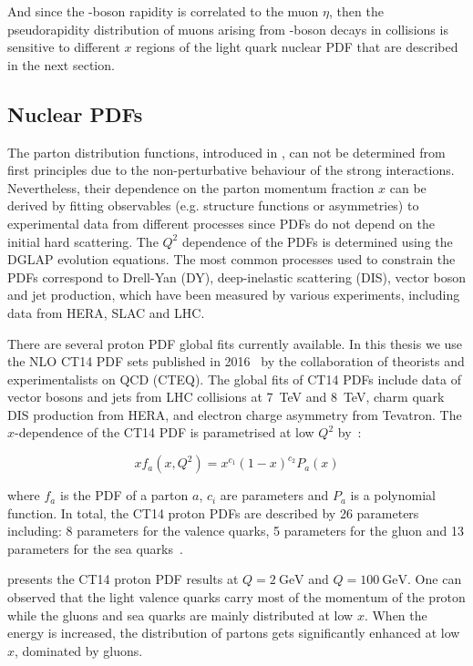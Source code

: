 And since the \Wb-boson rapidity is correlated to the muon $\eta$, then the pseudorapidity distribution of muons arising from \Wb-boson decays in \RunpPb collisions is sensitive to different $x$ regions of the light quark nuclear PDF that are described in the next section.


\subsection{Nuclear PDFs}\label{sec:WBoson_Introduction_nPDFs}

The parton distribution functions, introduced in , can not be determined from first principles due to the non-perturbative behaviour of the strong interactions. Nevertheless, their dependence on the parton momentum fraction $x$ can be derived by fitting observables (e.g. structure functions or asymmetries) to experimental data from different processes since PDFs do not depend on the initial hard scattering. The $Q^{2}$ dependence of the PDFs is determined using the DGLAP evolution equations. The most common processes used to constrain the PDFs correspond to Drell-Yan (DY), deep-inelastic scattering (DIS), vector boson and jet production, which have been measured by various experiments, including data from HERA, SLAC and LHC.

There are several proton PDF global fits currently available. In this thesis we use the NLO CT14 PDF sets published in 2016~\cite{CT14} by the collaboration of theorists and experimentalists on QCD (CTEQ). The global fits of CT14 PDFs include data of vector bosons and jets from LHC \Runpp collisions at \SI{7}{\TeV} and \SI{8}{\TeV}, charm quark DIS production from HERA, and electron charge asymmetry from Tevatron. The $x$-dependence of the CT14 PDF is parametrised at low $Q^{2}$ by~\cite{CT14}:

\begin{equation}
 xf_{a}\left(x, Q^{2}\right) = x^{c_{1}}\left(1-x\right)^{c_{2}}{P_{a}\left(x\right)}
\end{equation}

where $f_{a}$ is the PDF of a parton $a$, $c_{i}$ are parameters and $P_{a}$ is a polynomial function. In total, the CT14 proton PDFs are described by 26 parameters including: 8 parameters for the valence quarks, 5 parameters for the gluon and 13 parameters for the sea quarks~\cite{CT14}.

 presents the CT14 proton PDF results at $Q = \SI{2}{\GeV}$ and $Q = \SI{100}{\GeV}$. One can observed that the light valence quarks carry most of the momentum of the proton while the gluons and sea quarks are mainly distributed at low $x$. When the energy is increased, the distribution of partons gets significantly enhanced at low $x$, dominated by gluons.


